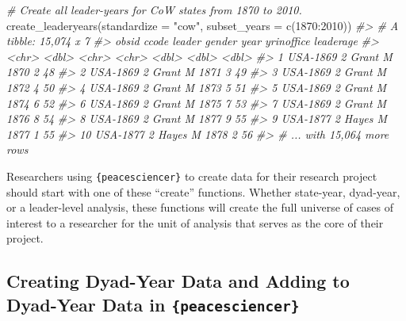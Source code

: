 \documentclass[
  11pt,
]{article}
\newenvironment{Shaded}{\begin{snugshade}}{\end{snugshade}}
\newcommand{\AttributeTok}[1]{\textcolor[rgb]{0.77,0.63,0.00}{#1}}
\newcommand{\CommentTok}[1]{\textcolor[rgb]{0.56,0.35,0.01}{\textit{#1}}}
\newcommand{\DecValTok}[1]{\textcolor[rgb]{0.00,0.00,0.81}{#1}}
\newcommand{\FunctionTok}[1]{\textcolor[rgb]{0.00,0.00,0.00}{#1}}
\newcommand{\NormalTok}[1]{#1}
\newcommand{\SpecialCharTok}[1]{\textcolor[rgb]{0.00,0.00,0.00}{#1}}
\newcommand{\StringTok}[1]{\textcolor[rgb]{0.31,0.60,0.02}{#1}}
\begin{document}
\begin{Shaded}
\begin{Highlighting}[]
\CommentTok{\# Create all leader{-}years for CoW states from 1870 to 2010.}
\FunctionTok{create\_leaderyears}\NormalTok{(}\AttributeTok{standardize =} \StringTok{"cow"}\NormalTok{, }\AttributeTok{subset\_years =} \FunctionTok{c}\NormalTok{(}\DecValTok{1870}\SpecialCharTok{:}\DecValTok{2010}\NormalTok{))}
\CommentTok{\#\textgreater{} \# A tibble: 15,074 x 7}
\CommentTok{\#\textgreater{}    obsid    ccode leader gender  year yrinoffice leaderage}
\CommentTok{\#\textgreater{}    \textless{}chr\textgreater{}    \textless{}dbl\textgreater{} \textless{}chr\textgreater{}  \textless{}chr\textgreater{}  \textless{}dbl\textgreater{}      \textless{}dbl\textgreater{}     \textless{}dbl\textgreater{}}
\CommentTok{\#\textgreater{}  1 USA{-}1869     2 Grant  M       1870          2        48}
\CommentTok{\#\textgreater{}  2 USA{-}1869     2 Grant  M       1871          3        49}
\CommentTok{\#\textgreater{}  3 USA{-}1869     2 Grant  M       1872          4        50}
\CommentTok{\#\textgreater{}  4 USA{-}1869     2 Grant  M       1873          5        51}
\CommentTok{\#\textgreater{}  5 USA{-}1869     2 Grant  M       1874          6        52}
\CommentTok{\#\textgreater{}  6 USA{-}1869     2 Grant  M       1875          7        53}
\CommentTok{\#\textgreater{}  7 USA{-}1869     2 Grant  M       1876          8        54}
\CommentTok{\#\textgreater{}  8 USA{-}1869     2 Grant  M       1877          9        55}
\CommentTok{\#\textgreater{}  9 USA{-}1877     2 Hayes  M       1877          1        55}
\CommentTok{\#\textgreater{} 10 USA{-}1877     2 Hayes  M       1878          2        56}
\CommentTok{\#\textgreater{} \# ... with 15,064 more rows}
\end{Highlighting}
\end{Shaded}

Researchers using \texttt{\{peacesciencer\}} to create data for their research project should start with one of these ``create'' functions. Whether state-year, dyad-year, or a leader-level analysis, these functions will create the full universe of cases of interest to a researcher for the unit of analysis that serves as the core of their project.

\hypertarget{creating-dyad-year-data-and-adding-to-dyad-year-data-in-peacesciencer}{%
\subsection{\texorpdfstring{Creating Dyad-Year Data and Adding to Dyad-Year Data in \texttt{\{peacesciencer\}}}{Creating Dyad-Year Data and Adding to Dyad-Year Data in \{peacesciencer\}}}\label{creating-dyad-year-data-and-adding-to-dyad-year-data-in-peacesciencer}}
\end{document}
